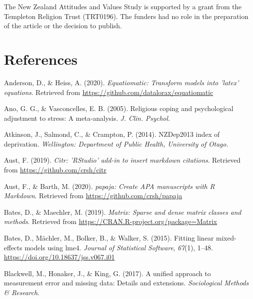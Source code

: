 \documentclass[
  english,
  man]{apa6}
\begin{document}
The New Zealand Attitudes and Values Study is supported by a grant from the Templeton Religion Trust (TRT0196). The funders had no role in the preparation of the article or the decision to publish.

\newpage

\hypertarget{references}{%
\section{References}\label{references}}

\begingroup
\setlength{\parindent}{-0.5in}
\setlength{\leftskip}{0.5in}

\hypertarget{refs}{}
\leavevmode\hypertarget{ref-R-equatiomatic}{}%
Anderson, D., \& Heiss, A. (2020). \emph{Equatiomatic: Transform models into 'latex' equations}. Retrieved from \url{https://github.com/datalorax/equatiomatic}

\leavevmode\hypertarget{ref-Ano2005-hx}{}%
Ano, G. G., \& Vasconcelles, E. B. (2005). Religious coping and psychological adjustment to stress: A meta‐analysis. \emph{J. Clin. Psychol.}

\leavevmode\hypertarget{ref-Atkinson2014-ex}{}%
Atkinson, J., Salmond, C., \& Crampton, P. (2014). NZDep2013 index of deprivation. \emph{Wellington: Department of Public Health, University of Otago}.

\leavevmode\hypertarget{ref-R-citr}{}%
Aust, F. (2019). \emph{Citr: 'RStudio' add-in to insert markdown citations}. Retrieved from \url{https://github.com/crsh/citr}

\leavevmode\hypertarget{ref-R-papaja}{}%
Aust, F., \& Barth, M. (2020). \emph{papaja: Create APA manuscripts with R Markdown}. Retrieved from \url{https://github.com/crsh/papaja}

\leavevmode\hypertarget{ref-R-Matrix}{}%
Bates, D., \& Maechler, M. (2019). \emph{Matrix: Sparse and dense matrix classes and methods}. Retrieved from \url{https://CRAN.R-project.org/package=Matrix}

\leavevmode\hypertarget{ref-R-lme4}{}%
Bates, D., Mächler, M., Bolker, B., \& Walker, S. (2015). Fitting linear mixed-effects models using lme4. \emph{Journal of Statistical Software}, \emph{67}(1), 1--48. \url{https://doi.org/10.18637/jss.v067.i01}

\leavevmode\hypertarget{ref-Blackwell2017-oq}{}%
Blackwell, M., Honaker, J., \& King, G. (2017). A unified approach to measurement error and missing data: Details and extensions. \emph{Sociological Methods \& Research}.
\end{document}
